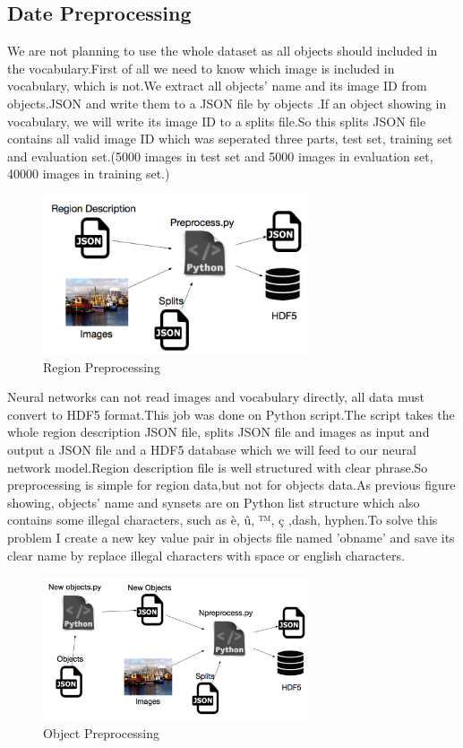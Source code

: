 \documentclass[12pt,a4paper]{report}
\begin{document}
\subsection{Date Preprocessing}
We are not planning to use the whole dataset as all objects should included in  the vocabulary.First of all we need to know which image is included in vocabulary, which is not.We extract all objects' name and its image ID  from objects.JSON  and write them to a JSON file by objects .If an object showing in  vocabulary, we will write its image ID to a splits file.So this splits JSON file contains all valid image ID which was seperated three parts, test set, training set and evaluation set.(5000 images in test set and 5000 images in evaluation set, 40000 images in training set.)
\begin{figure}[h]
\centering
\includegraphics[width=0.7\textwidth]{regionc.png}
\caption{Region Preprocessing}
\end{figure}

Neural networks can not read images and vocabulary directly, all data must convert to HDF5 format.This job was done on Python script.The script takes the whole region description JSON file, splits JSON file and images as input and output a JSON file and a HDF5 database which we will feed to our neural network model.Region description file is well structured with clear phrase.So preprocessing is simple for region data,but not for objects data.As previous figure showing, objects' name and synsets  are on Python list structure which also contains some illegal characters, such as è, û, ™, ç ,dash, hyphen.To solve this problem I create a new key value pair  in objects file named 'obname' and save its clear name by replace illegal characters with space or english characters.


\begin{figure}[h]
\centering
\includegraphics[width=0.7\textwidth]{objectc.png}
\caption{Object Preprocessing}
\end{figure}
\end{document}

